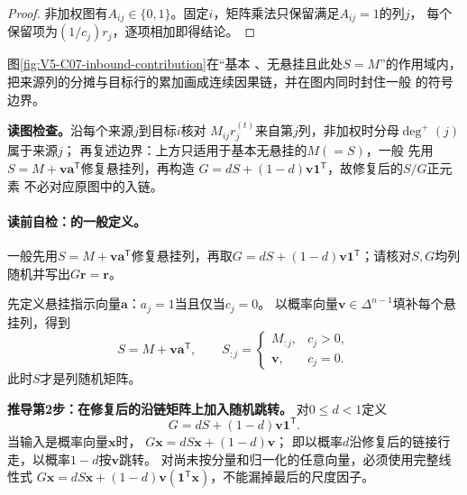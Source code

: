 \begin{proof}
非加权图有$A_{ij}\in\{0,1\}$。固定$i$，矩阵乘法只保留满足$A_{ij}=1$的列$j$，
每个保留项为$(1/c_j)r_j$，逐项相加即得结论。
\end{proof}
图\ref{fig:V5-C07-inbound-contribution}在“基本 \PageRank{}、无悬挂且此处$S=M$”的作用域内，把来源列的分摊与目标行的累加画成连续因果链，并在图内同时封住一般 \PageRank{} 的符号边界。

\FloatBarrier
\noindent\textbf{读图检查。}沿每个来源$j$到目标$i$核对
$M_{ij}r_j^{(t)}$来自第$j$列，非加权时分母$\deg^+(j)$属于来源$j$；
再复述边界：上方只适用于基本无悬挂的$M(=S)$，一般 \PageRank{} 先用
$S=M+\boldsymbol v\boldsymbol a^{\mathsf T}$修复悬挂列，再构造
$G=dS+(1-d)\boldsymbol v\boldsymbol1^{\mathsf T}$，故修复后的$S/G$正元素
不必对应原图中的入链。

\paragraph{读前自检：\PageRank{}的一般定义。}一般\PageRank{}先用$S=M+\boldsymbol v\boldsymbol a^{\mathsf T}$修复悬挂列，再取$G=dS+(1-d)\boldsymbol v\boldsymbol1^{\mathsf T}$；请核对$S,G$均列随机并写出$G\boldsymbol r=\boldsymbol r$。\par


先定义悬挂指示向量$\boldsymbol a$：$a_j=1$当且仅当$c_j=0$。
以概率向量$\boldsymbol v\in\Delta^{n-1}$填补每个悬挂列，得到
\begin{equation}
S=M+\boldsymbol v\boldsymbol a^{\mathsf T},
\qquad
S_{:j}=\begin{cases}M_{:j},&c_j>0,\\ \boldsymbol v,&c_j=0.\end{cases}
\label{eq:V5-C07-dangling-repair}
\end{equation}
此时$S$才是列随机矩阵。

\textbf{推导第2步：在修复后的沿链矩阵上加入随机跳转。}
对$0\le d<1$定义
\begin{equation}
G=dS+(1-d)\boldsymbol v\boldsymbol1^{\mathsf T}.
\label{eq:V5-C07-google-matrix}
\end{equation}
当输入是概率向量$\boldsymbol x$时，
$G\boldsymbol x=dS\boldsymbol x+(1-d)\boldsymbol v$；
即以概率$d$沿修复后的链接行走，以概率$1-d$按$\boldsymbol v$跳转。
对尚未按分量和归一化的任意向量，必须使用完整线性式
$G\boldsymbol x=dS\boldsymbol x+(1-d)\boldsymbol v
(\boldsymbol1^{\mathsf T}\boldsymbol x)$，不能漏掉最后的尺度因子。


